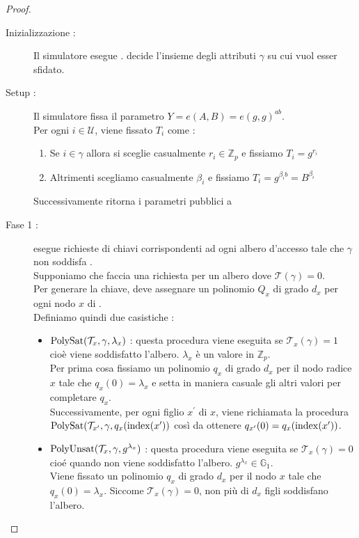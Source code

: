 \begin{thm}
\begin{proof}
\begin{description}
\item[Inizializzazione :] Il simulatore  esegue .  decide l'insieme degli attributi $\gamma$ su cui vuol esser sfidato.
\item[Setup :] Il simulatore  fissa il parametro $Y= e(A,B) = e(g,g)^{ab}$.\\
Per ogni $i \in \mathcal{U}$, viene fissato $T_i$ come :
\begin{enumerate}
\item Se $i \in \gamma$ allora si sceglie casualmente $r_i \in \mathbb{Z}_p$ e fissiamo $T_i = g^{r_i}$
\item Altrimenti scegliamo casualmente $\beta_i$ e fissiamo $T_i = g^{\beta_i b} = B^{\beta_i}$
\end{enumerate}
Successivamente  ritorna i parametri pubblici a 
\item[Fase 1 :]  esegue richieste di chiavi corrispondenti ad ogni albero d'accesso  tale che $\gamma$ non soddisfa .\\
Supponiamo che  faccia una richiesta per un albero  dove $\mathcal{T}(\gamma) = 0$.\\
Per generare la chiave,  deve assegnare un polinomio $Q_x$ di grado $d_x$ per ogni nodo $x$ di .\\
Definiamo quindi due casistiche :
\begin{itemize}
\item $\operatorname{PolySat} (\mathcal{T}_x , \gamma, \lambda_x )$ : questa procedura viene eseguita se $\mathcal{T}_x(\gamma) = 1$ cioè viene soddisfatto l'albero. $\lambda_x$ è un valore in $\mathbb{Z}_p$.\\
Per prima cosa fissiamo un polinomio $q_x$ di grado $d_x$ per il nodo radice $x$ tale che $q_x(0) = \lambda_x$ e setta in maniera casuale gli altri valori per completare $q_x$.\\
Successivamente, per ogni figlio $x^\prime$ di $x$, viene richiamata la procedura $\operatorname{PolySat}(\mathcal{T}_{x^\prime}, \gamma, q_x(\operatorname{index}(x^\prime))$ così da ottenere $q_{x^\prime} (0) = q_x (\operatorname{index}(x^\prime))$.
\item $\operatorname{PolyUnsat}(\mathcal{T}_x, \gamma , g^{\lambda_x})$ : questa procedura viene eseguita se $\mathcal{T}_x (\gamma) = 0$ cioé quando non viene soddisfatto l'albero. $g^{\lambda_x} \in \mathbb{G}_1$.\\
Viene fissato un polinomio $q_x$ di grado $d_x$ per il nodo $x$ tale che $q_x(0) = \lambda_x$. Siccome $\mathcal{T}_x(\gamma) = 0$, non più di $d_x$ figli soddisfano l'albero.\\

\end{itemize}
\end{description}
\end{proof}
\end{thm}
